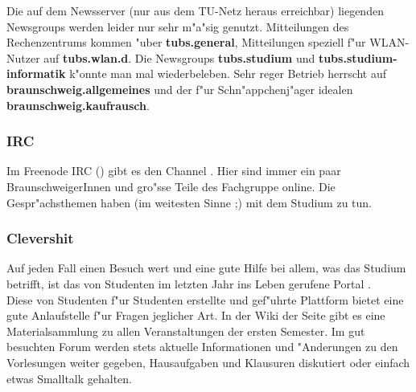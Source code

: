 Die auf dem Newsserver  (nur aus dem TU-Netz heraus
erreichbar) liegenden Newsgroups werden leider nur sehr m"a"sig genutzt.
Mitteilungen des Rechenzentrums kommen "uber \textbf{tubs.general},
Mitteilungen speziell f"ur WLAN-Nutzer auf \textbf{tubs.wlan.d}. Die Newsgroups
\textbf{tubs.studium} und \textbf{tubs.studium-informatik} k"onnte man mal
wiederbeleben. Sehr reger Betrieb herrscht auf
\textbf{braunschweig.allgemeines} und der f"ur Schn"appchenj"ager idealen
\textbf{braunschweig.kaufrausch}.

\subsubsection*{IRC}

Im Freenode IRC () gibt es den Channel . Hier
sind immer ein paar BraunschweigerInnen und gro"sse Teile des Fachgruppe online. Die Gespr"achsthemen haben (im weitesten
Sinne ;) mit dem Studium zu tun.

\subsubsection*{Clevershit}

Auf jeden Fall einen Besuch wert und eine gute Hilfe bei allem, was das Studium betrifft, ist das von Studenten im letzten Jahr ins Leben gerufene Portal \mbox{}.\\
Diese von Studenten f"ur Studenten erstellte und gef"uhrte Plattform bietet eine gute Anlaufstelle f"ur Fragen jeglicher Art. In der Wiki der Seite gibt es eine Materialsammlung zu allen Veranstaltungen der ersten Semester. Im gut besuchten Forum werden stets aktuelle Informationen und "Anderungen zu den Vorlesungen weiter gegeben, Hausaufgaben und Klausuren diskutiert oder einfach etwas Smalltalk gehalten.
